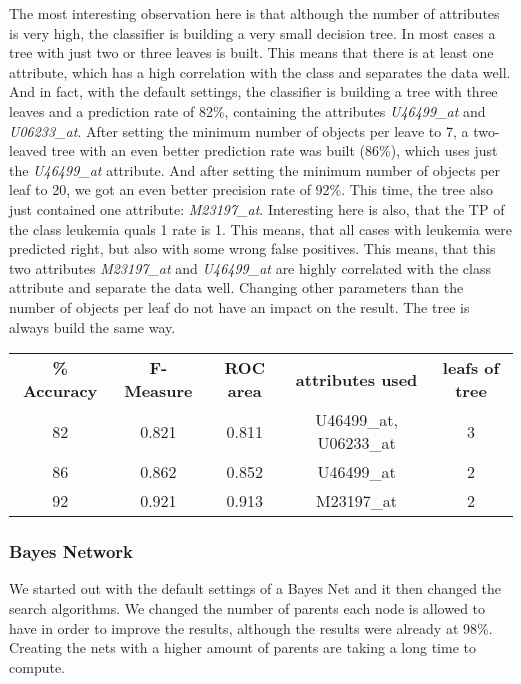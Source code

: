 \documentclass{article}
\begin{document}
The most interesting observation here is that although the number of attributes is very high, the classifier is building a very small decision tree. In most cases a tree with just two or three leaves is built. This means that there is at least one attribute, which has a high correlation with the class and separates the data well. And in fact, with the default settings, the classifier is building a tree with three leaves and a prediction rate of 82\%, containing the attributes \emph{U46499\_at} and \emph{U06233\_at}. After setting the minimum number of objects per leave to 7, a two-leaved tree with an even better prediction rate was built (86\%), which uses just the \emph{U46499\_at}  attribute. And after setting the minimum number of objects per leaf to 20, we got an even better precision rate of 92\%. This time, the tree also just contained one attribute: \emph{M23197\_at}. Interesting here is also, that the TP of the class leukemia quals 1 rate is 1. This means, that all cases with leukemia were predicted right, but also with some wrong false positives. This means, that this two attributes \emph{M23197\_at} and \emph{U46499\_at} are highly correlated with the class attribute and separate the data well. 
Changing other parameters than the number of objects per leaf do not have an impact on the result. The tree is always build the same way. 

\begin{center}
\begin{tabular}{ c | c | c | c |  c }
\textbf{\% Accuracy} & \textbf{F-Measure} & \textbf{ROC area} & \textbf{attributes used} & \textbf{leafs of tree}\\
82 & 0.821 & 0.811 & U46499\_at, U06233\_at & 3 \\
86 & 0.862 & 0.852 & U46499\_at & 2 \\
92 & 0.921 & 0.913 & M23197\_at & 2 \\
\end{tabular}
\end{center}

\subsubsection{Bayes Network}
We started out with the default settings of a Bayes Net and it then changed the search algorithms. We changed the number of parents each node is allowed to have in order to improve the results, although the results were already at 98\%. Creating the nets with a higher amount of parents are taking a long time to compute.
\end{document}
